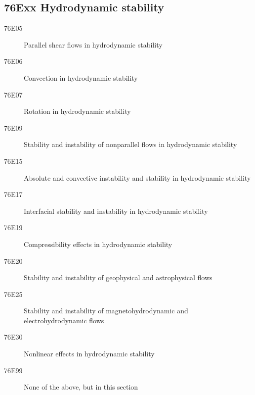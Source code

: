 \subsection*{76Exx  Hydrodynamic stability }\label{76Exx}
\begin{description}  
\item [76E05]\label{76E05} Parallel shear flows in hydrodynamic stability
\item [76E06]\label{76E06} Convection in hydrodynamic stability
\item [76E07]\label{76E07} Rotation in hydrodynamic stability
\item [76E09]\label{76E09} Stability and instability of nonparallel flows in hydrodynamic stability
\item [76E15]\label{76E15} Absolute and convective instability and stability in hydrodynamic stability
\item [76E17]\label{76E17} Interfacial stability and instability in hydrodynamic stability
\item [76E19]\label{76E19} Compressibility effects in hydrodynamic stability
\item [76E20]\label{76E20} Stability and instability of geophysical and astrophysical flows
\item [76E25]\label{76E25} Stability and instability of magnetohydrodynamic and electrohydrodynamic flows
\item [76E30]\label{76E30} Nonlinear effects in hydrodynamic stability
\item [76E99]\label{76E99} None of the above, but in this section
\end{description}
